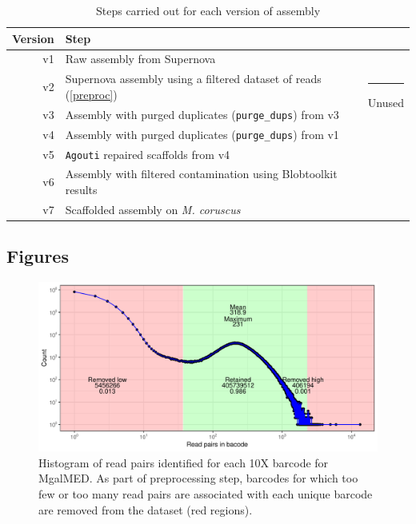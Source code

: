 \documentclass[11pt, a4paper]{article}
\begin{document}
\begin{table}[h]
	\caption{Steps carried out for each version of assembly}
	\label{suptab:versions}
	\begin{tabular}{rll}
		Version & Step & \\ \toprule
		\rowcolor{gray!20}
		v1 & Raw assembly from Supernova & \\
		v2 & Supernova assembly using a filtered dataset of reads (\cref{preproc}) & \multirow{2}{*}{\rule{1pt}{25pt} Unused} \\
		v3 & Assembly with purged duplicates (\texttt{purge\_dups}) from v3 & \\
		\rowcolor{gray!20}
		v4 & Assembly with purged duplicates (\texttt{purge\_dups}) from v1 & \\
		\rowcolor{gray!20}
		v5 & \texttt{Agouti} repaired scaffolds from v4 & \\
		\rowcolor{gray!20}
		v6 & Assembly with filtered contamination using Blobtoolkit results & \\
		\rowcolor{gray!20}
		v7 & Scaffolded assembly on \textit{M. coruscus} & \\ \bottomrule
	\end{tabular}
\end{table}
\vspace{3em}

\subsection*{Figures}
\begin{figure}[h]
	\includegraphics[width=\linewidth]{figures/supfig_MgalMED_preproc_barcode_filt.pdf}
	\caption{Histogram of read pairs identified for each 10X barcode for MgalMED.
		As part of preprocessing step, barcodes for which too few or too many read pairs are associated with each unique barcode are removed from the dataset (red regions).}
	\label{supfig:preproc_MgalMED}
\end{figure}
\end{document}
